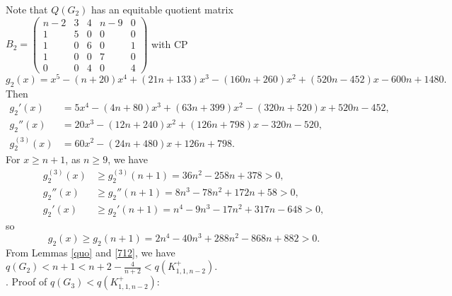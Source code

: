 \documentclass[12pt]{article}
\begin{document}
\begin{appendices}
Note that $Q(G_2)$ has an equitable quotient matrix
$B_2=
\left(\begin{smallmatrix}
n-2 &  3  & 4 & n-9 & 0 \\
1   &  5  & 0 & 0   & 0 \\
1   &  0  & 6 & 0   & 1 \\
1   &  0  & 0 & 7   & 0 \\
0   &  0  & 4 & 0   & 4
\end{smallmatrix}\right)$
with CP
\[
g_2(x)=x^5-(n+20)x^4+(21n+133)x^3-(160n+260)x^2+(520n-452)x-600n+1480.
\]
Then
\begin{align*}
g_2'(x)&=5x^4 - (4n + 80)x^3 + (63n + 399)x^2 - ( 320n + 520)x + 520n - 452,\\
g_2''(x)&=20x^3 - ( 12n + 240)x^2 + (126n + 798)x - 320n - 520,\\
g_2^{(3)}(x)&=60x^2 - ( 24n + 480)x + 126n + 798.
\end{align*}
For $x\ge n+1$, as $n\ge 9$, we have
\begin{align*}
g_2^{(3)}(x)&\ge g_2^{(3)}(n+1)=36n^2 - 258n + 378>0,\\
g_2''(x)&\ge g_2''(n+1)=8n^3 - 78n^2 + 172n + 58>0,\\
g_2'(x)&\ge g_2'(n+1)=n^4 - 9n^3 - 17n^2 + 317n - 648>0,
\end{align*}
so
\[
g_2(x)\ge g_2(n+1)=2n^4 - 40n^3 + 288n^2 - 868n + 882>0.
\]
From Lemmas \ref{quo} and \ref{712}, we have $q(G_2)<n+1<n+2-\frac{4}{n+2}<q(K_{1,1,n-2}^+)$.\\




. Proof of $q(G_3)<q(K_{1,1,n-2}^+)$:


\end{appendices}
\end{document}
